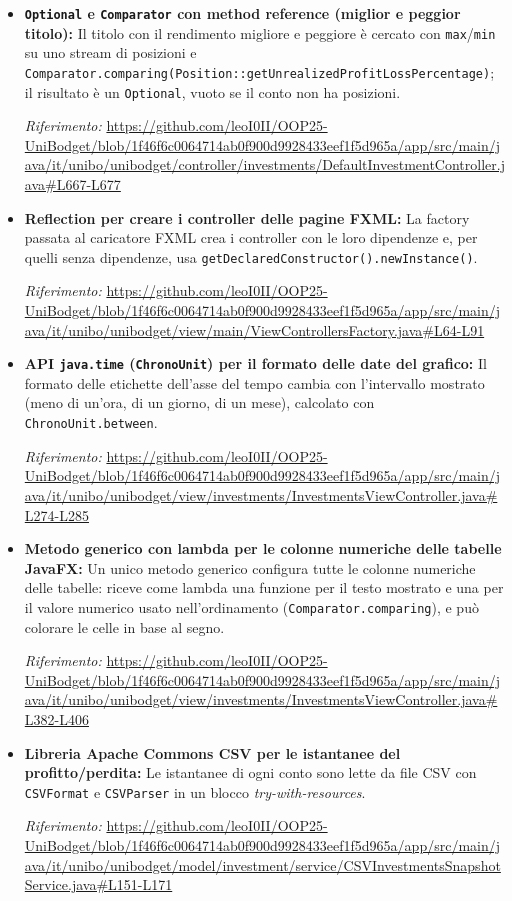 \documentclass[11pt,a4paper,openright]{report}
\begin{document}
\begin{itemize}[itemsep=5pt,topsep=3pt]
    \item \textbf{\texttt{Optional} e \texttt{Comparator} con method reference (miglior e peggior titolo):} Il titolo con il rendimento migliore e peggiore è cercato con \texttt{max}/\texttt{min} su uno stream di posizioni e \texttt{Comparator.comparing(Position::getUnrealizedProfitLossPercentage)}; il risultato è un \texttt{Optional}, vuoto se il conto non ha posizioni.
    \par\emph{Riferimento:} \url{https://github.com/leoI0II/OOP25-UniBodget/blob/1f46f6c0064714ab0f900d9928433eef1f5d965a/app/src/main/java/it/unibo/unibodget/controller/investments/DefaultInvestmentController.java#L667-L677}

    \item \textbf{Reflection per creare i controller delle pagine FXML:} La factory passata al caricatore FXML crea i controller con le loro dipendenze e, per quelli senza dipendenze, usa \texttt{getDeclaredConstructor().newInstance()}.
    \par\emph{Riferimento:} \url{https://github.com/leoI0II/OOP25-UniBodget/blob/1f46f6c0064714ab0f900d9928433eef1f5d965a/app/src/main/java/it/unibo/unibodget/view/main/ViewControllersFactory.java#L64-L91}

    \item \textbf{API \texttt{java.time} (\texttt{ChronoUnit}) per il formato delle date del grafico:} Il formato delle etichette dell'asse del tempo cambia con l'intervallo mostrato (meno di un'ora, di un giorno, di un mese), calcolato con \texttt{ChronoUnit.between}.
    \par\emph{Riferimento:} \url{https://github.com/leoI0II/OOP25-UniBodget/blob/1f46f6c0064714ab0f900d9928433eef1f5d965a/app/src/main/java/it/unibo/unibodget/view/investments/InvestmentsViewController.java#L274-L285}

    \item \textbf{Metodo generico con lambda per le colonne numeriche delle tabelle JavaFX:} Un unico metodo generico configura tutte le colonne numeriche delle tabelle: riceve come lambda una funzione per il testo mostrato e una per il valore numerico usato nell'ordinamento (\texttt{Comparator.comparing}), e può colorare le celle in base al segno.
    \par\emph{Riferimento:} \url{https://github.com/leoI0II/OOP25-UniBodget/blob/1f46f6c0064714ab0f900d9928433eef1f5d965a/app/src/main/java/it/unibo/unibodget/view/investments/InvestmentsViewController.java#L382-L406}

    \item \textbf{Libreria Apache Commons CSV per le istantanee del profitto/perdita:} Le istantanee di ogni conto sono lette da file CSV con \texttt{CSVFormat} e \texttt{CSVParser} in un blocco \emph{try-with-resources}.
    \par\emph{Riferimento:} \url{https://github.com/leoI0II/OOP25-UniBodget/blob/1f46f6c0064714ab0f900d9928433eef1f5d965a/app/src/main/java/it/unibo/unibodget/model/investment/service/CSVInvestmentsSnapshotService.java#L151-L171}


\end{itemize}
\end{document}
